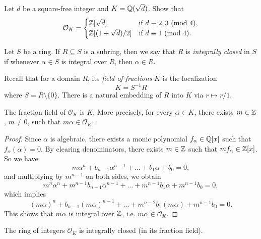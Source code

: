 \begin{exercise}
  Let $d$ be a square-free integer and
  $K = \mathbb{Q}(\sqrt{d})$. Show that
  \[
    \mathcal{O}_K =
    \begin{cases}
      \mathbb{Z}[\sqrt{d}] & \text{if $d \equiv 2, 3 \ (\mathrm{mod}\ 4)$}, \\
      \mathbb{Z}[(1 + \sqrt{d}) / 2] & \text{if $d \equiv 1 \ (\mathrm{mod}\ 4)$}.
    \end{cases}
  \]
\end{exercise}

\begin{definition}
  Let $S$ be a ring.
  If $R \subseteq S$ is a subring, then we say that
  $R$ is \emph{integrally closed} in $S$ if whenever
  $\alpha \in S$ is integral over $R$, then
  $\alpha \in R$.
\end{definition}

\begin{remark}
  Recall that for a domain $R$, its \emph{field of fractions} $K$ is the
  localization
  \[
    K = S^{-1} R
  \]
  where $S = R \setminus \{0\}$. There is a natural
  embedding of $R$ into $K$ via $r \mapsto r / 1$.
\end{remark}

\begin{lemma}
  The fraction field of $\mathcal{O}_K$ is $K$. More
  precisely, for every $\alpha \in K$, there exists
  $m \in \mathbb{Z}$, $m \ne 0$, such that $m\alpha \in \mathcal{O}_K$.
\end{lemma}

\begin{proof}
  Since $\alpha$ is algebraic, there exists a monic
  polynomial $f_\alpha \in \mathbb{Q}[x]$ such that
  $f_\alpha(\alpha) = 0$. By clearing denominators, there
  exists $m \in \mathbb{Z}$ such that $mf_\alpha \in \mathbb{Z}[x]$.
  So we have
  \[
    m \alpha^n + b_{n - 1} \alpha^{n - 1} + \dots + b_1 \alpha + b_0 = 0,
  \]
  and multiplying by $m^{n - 1}$ on both sides, we obtain
  \[
    m^n \alpha^n + m^{n - 1} b_{n - 1} \alpha^{n - 1} + \dots + m^{n - 1} b_1 \alpha + m^{n - 1} b_0 = 0,
  \]
  which implies
  \[
    (m\alpha)^n + b_{n - 1} (m\alpha)^{n - 1} + \dots + m^{n - 2} b_1 (m\alpha) + m^{n - 1} b_0 = 0.
  \]
  This shows that $m\alpha$ is integral over $\mathbb{Z}$,
  i.e. $m\alpha \in \mathcal{O}_K$.
\end{proof}

\begin{theorem}
  The ring of integers $\mathcal{O}_K$ is
  integrally closed (in its fraction field).
\end{theorem}


